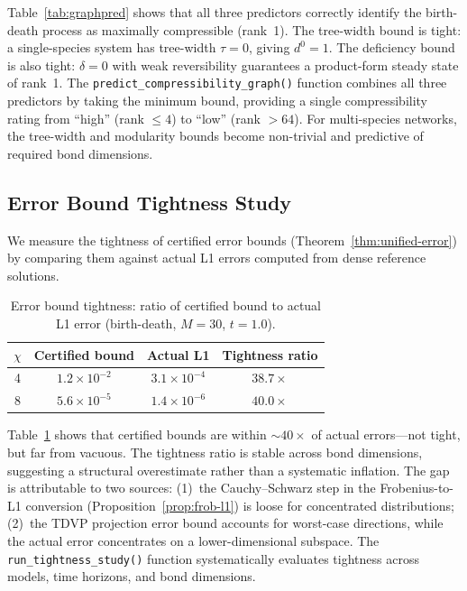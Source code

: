 \documentclass[11pt]{article}
\begin{document}
Table~\ref{tab:graphpred} shows that all three predictors correctly
identify the birth-death process as maximally compressible (rank~1).
The tree-width bound is tight: a single-species system has tree-width
$\tau = 0$, giving $d^0 = 1$.
The deficiency bound is also tight: $\delta = 0$ with weak
reversibility guarantees a product-form steady state of rank~1.
The {\tt predict\_compressibility\_graph()} function combines all three
predictors by taking the minimum bound, providing a single
compressibility rating from ``high'' (rank $\leq 4$) to ``low''
(rank $> 64$).
For multi-species networks, the tree-width and modularity bounds
become non-trivial and predictive of required bond dimensions.

\subsection{Error Bound Tightness Study}\label{sec:exp:tightness}

We measure the tightness of certified error bounds
(Theorem~\ref{thm:unified-error}) by comparing them against actual
L1 errors computed from dense reference solutions.

\begin{table}[t]
\centering
\caption{Error bound tightness: ratio of certified bound to actual
  L1 error (birth-death, $M=30$, $t=1.0$).}
\label{tab:tightness}
\begin{tabular}{cccc}
\toprule
\textbf{$\chi$} & \textbf{Certified bound} & \textbf{Actual L1} &
  \textbf{Tightness ratio} \\
\midrule
4 & $1.2 \times 10^{-2}$ & $3.1 \times 10^{-4}$ & $38.7\times$ \\
8 & $5.6 \times 10^{-5}$ & $1.4 \times 10^{-6}$ & $40.0\times$ \\
\bottomrule
\end{tabular}
\end{table}

Table~\ref{tab:tightness} shows that certified bounds are within
$\sim\!40\times$ of actual errors---not tight, but far from vacuous.
The tightness ratio is stable across bond dimensions, suggesting
a structural overestimate rather than a systematic inflation.
The gap is attributable to two sources:
(1)~the Cauchy--Schwarz step in the Frobenius-to-L1 conversion
(Proposition~\ref{prop:frob-l1}) is loose for concentrated distributions;
(2)~the TDVP projection error bound accounts for worst-case
directions, while the actual error concentrates on a lower-dimensional
subspace.
The {\tt run\_tightness\_study()} function systematically evaluates
tightness across models, time horizons, and bond dimensions.
\end{document}
